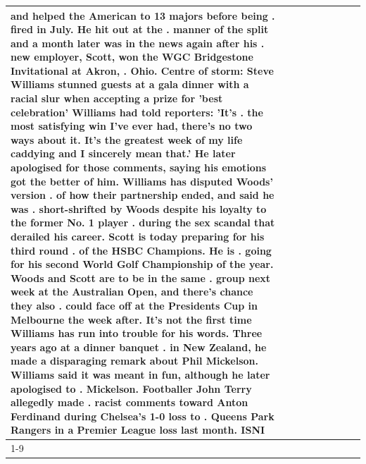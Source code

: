 \begin{table}[H]
\begin{tabular}{lllrlllll}
and helped the American to 13 majors before being . fired in July. He hit out at the . manner of the split and a month later was in the news again after his . new employer, Scott, won the WGC Bridgestone Invitational at Akron, . Ohio. Centre of storm: Steve Williams stunned guests at a gala dinner with a racial slur when accepting a prize for 'best celebration' Williams had told reporters: 'It's . the most satisfying win I've ever had, there's no two ways about it. It's the greatest week of my life caddying and I sincerely mean that.' He later apologised for those comments, saying his emotions got the better of him. Williams has disputed Woods' version . of how their partnership ended, and said he was . short-shrifted by Woods despite his loyalty to the former No. 1 player . during the sex scandal that derailed his career. Scott is today preparing for his third round . of the HSBC Champions. He is . going for his second World Golf Championship of the year. Woods and Scott are to be in the same . group next week at the Australian Open, and there's chance they also . could face off at the Presidents Cup in Melbourne the week after. It's not the first time Williams has run into trouble for his words. Three years ago at a dinner banquet . in New Zealand, he made a disparaging remark about Phil Mickelson. Williams said it was meant in fun, although he later apologised to . Mickelson. Footballer John Terry allegedly made . racist comments toward Anton Ferdinand during Chelsea's 1-0 loss to . Queens Park Rangers in a Premier League loss last month. ISNI \\
\cline{1-9}

\end{tabular}
\end{table}
